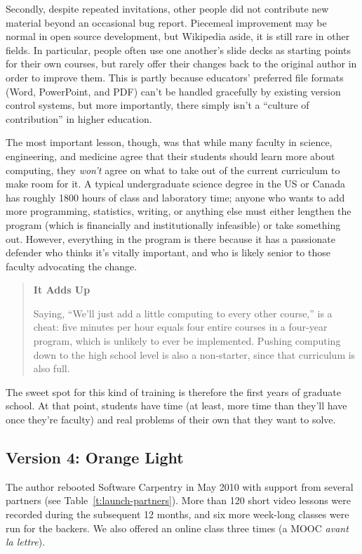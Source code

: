 \documentclass[10pt,a4paper,twocolumn]{article}
\begin{document}
Secondly, despite repeated invitations, other people did not
contribute new material beyond an occasional bug report.  Piecemeal
improvement may be normal in open source development, but Wikipedia
aside, it is still rare in other fields. In particular, people often
use one another's slide decks as starting points for their own
courses, but rarely offer their changes back to the original author in
order to improve them. This is partly because educators' preferred
file formats (Word, PowerPoint, and PDF) can't be handled gracefully
by existing version control systems, but more importantly, there
simply isn't a ``culture of contribution'' in higher education.

The most important lesson, though, was that while many faculty in
science, engineering, and medicine agree that their students should
learn more about computing, they \emph{won't} agree on what to take
out of the current curriculum to make room for it. A typical
undergraduate science degree in the US or Canada has roughly 1800
hours of class and laboratory time; anyone who wants to add more
programming, statistics, writing, or anything else must either
lengthen the program (which is financially and institutionally
infeasible) or take something out. However, everything in the program
is there because it has a passionate defender who thinks it's vitally
important, and who is likely senior to those faculty advocating the
change.

\begin{quote}
\textbf{It Adds Up}

Saying, ``We'll just add a little computing to every other course,'' is
a cheat: five minutes per hour equals four entire courses in a four-year
program, which is unlikely to ever be implemented. Pushing computing
down to the high school level is also a non-starter, since that
curriculum is also full.
\end{quote}

The sweet spot for this kind of training is therefore the first years
of graduate school. At that point, students have time (at least, more
time than they'll have once they're faculty) and real problems of
their own that they want to solve.

\subsection*{Version 4: Orange Light}

The author rebooted Software Carpentry in May 2010 with support from
several partners (see Table~\ref{t:launch-partners}). More than 120
short video lessons were recorded during the subsequent 12 months, and
six more week-long classes were run for the backers. We also offered
an online class three times (a MOOC \emph{avant la lettre}).
\end{document}
